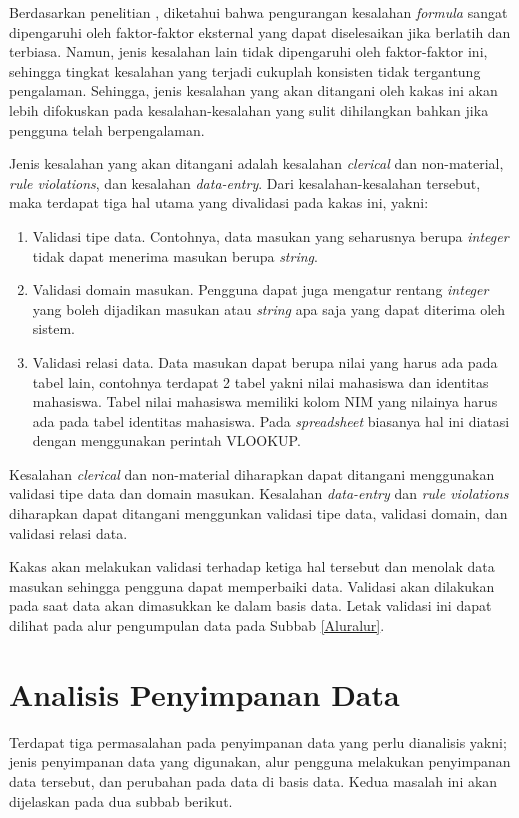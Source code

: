 Berdasarkan penelitian \citep{Howe2006}, diketahui bahwa pengurangan kesalahan \textit{formula} sangat dipengaruhi oleh faktor-faktor eksternal yang dapat diselesaikan jika berlatih dan terbiasa. Namun, jenis kesalahan lain tidak dipengaruhi oleh faktor-faktor ini, sehingga tingkat kesalahan yang terjadi cukuplah konsisten tidak tergantung pengalaman. Sehingga, jenis kesalahan yang akan ditangani oleh kakas ini akan lebih difokuskan pada kesalahan-kesalahan yang sulit dihilangkan bahkan jika pengguna telah berpengalaman.

Jenis kesalahan yang akan ditangani adalah kesalahan \textit{clerical} dan non-material, \textit{rule violations}, dan kesalahan \textit{data-entry}. Dari kesalahan-kesalahan tersebut, maka terdapat tiga hal utama yang divalidasi pada kakas ini, yakni:
\begin{enumerate}
	\item Validasi tipe data. Contohnya, data masukan yang seharusnya berupa \textit{integer} tidak dapat menerima masukan berupa \textit{string}.
	\item Validasi domain masukan. Pengguna dapat juga mengatur rentang \textit{integer} yang boleh dijadikan masukan atau \textit{string} apa saja yang dapat diterima oleh sistem.
	\item Validasi relasi data. Data masukan dapat berupa nilai yang harus ada pada tabel lain, contohnya terdapat 2 tabel yakni nilai mahasiswa dan identitas mahasiswa. Tabel nilai mahasiswa memiliki kolom NIM yang nilainya harus ada pada tabel identitas mahasiswa. Pada \textit{spreadsheet} biasanya hal ini diatasi dengan menggunakan perintah VLOOKUP.
\end{enumerate}

Kesalahan \textit{clerical} dan non-material diharapkan dapat ditangani menggunakan validasi tipe data dan domain masukan. Kesalahan \textit{data-entry} dan \textit{rule violations} diharapkan dapat ditangani menggunkan validasi tipe data, validasi domain, dan validasi relasi data.

Kakas akan melakukan validasi terhadap ketiga hal tersebut dan menolak data masukan sehingga pengguna dapat memperbaiki data. Validasi akan dilakukan pada saat data akan dimasukkan ke dalam basis data. Letak validasi ini dapat dilihat pada alur pengumpulan data pada Subbab \ref{Aluralur}.

\section{Analisis Penyimpanan Data}
Terdapat tiga permasalahan pada penyimpanan data yang perlu dianalisis yakni; jenis penyimpanan data yang digunakan, alur pengguna melakukan penyimpanan data tersebut, dan perubahan pada data di basis data. Kedua masalah ini akan dijelaskan pada dua subbab berikut.

